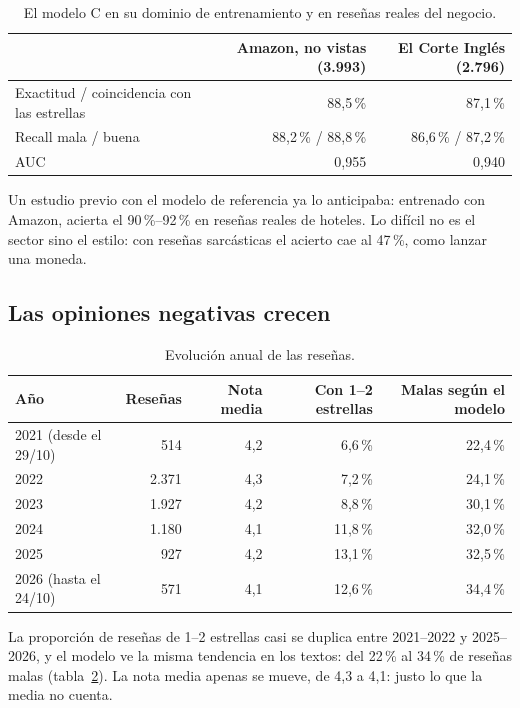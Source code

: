 \documentclass[11pt,a4paper]{article}
\newcommand{\pct}[1]{#1\,\%}
\begin{document}
\begin{table}[htbp]
\centering\small
\caption{El modelo C en su dominio de entrenamiento y en reseñas reales del negocio.}
\label{tab:coincidencia}
\begin{tabular}{@{}lrr@{}}
\toprule
 & Amazon, no vistas (3.993) & El Corte Inglés (2.796) \\
\midrule
Exactitud / coincidencia con las estrellas & \pct{88,5} & \pct{87,1} \\
Recall mala / buena & \pct{88,2} / \pct{88,8} & \pct{86,6} / \pct{87,2} \\
AUC & 0,955 & 0,940 \\
\bottomrule
\end{tabular}
\end{table}

Un estudio previo con el modelo de referencia ya lo anticipaba: entrenado con Amazon, acierta el
\pct{90}--\pct{92} en reseñas reales de hoteles. Lo difícil no es el sector sino el estilo: con reseñas sarcásticas
el acierto cae al \pct{47}, como lanzar una moneda.

\subsection{Las opiniones negativas crecen}

\begin{table}[htbp]
\centering\small
\caption{Evolución anual de las reseñas.}
\label{tab:evolucion}
\begin{tabular}{@{}lrrrr@{}}
\toprule
Año & Reseñas & Nota media & Con 1--2 estrellas & Malas según el modelo \\
\midrule
2021 (desde el 29/10) & 514   & 4,2 & \pct{6,6}  & \pct{22,4} \\
2022                  & 2.371 & 4,3 & \pct{7,2}  & \pct{24,1} \\
2023                  & 1.927 & 4,2 & \pct{8,8}  & \pct{30,1} \\
2024                  & 1.180 & 4,1 & \pct{11,8} & \pct{32,0} \\
2025                  & 927   & 4,2 & \pct{13,1} & \pct{32,5} \\
2026 (hasta el 24/10) & 571   & 4,1 & \pct{12,6} & \pct{34,4} \\
\bottomrule
\end{tabular}
\end{table}

La proporción de reseñas de 1--2 estrellas casi se duplica entre 2021--2022 y 2025--2026, y el modelo ve la misma
tendencia en los textos: del \pct{22} al \pct{34} de reseñas malas (tabla~\ref{tab:evolucion}). La nota media
apenas se mueve, de 4,3 a 4,1: justo lo que la media no cuenta.
\end{document}
